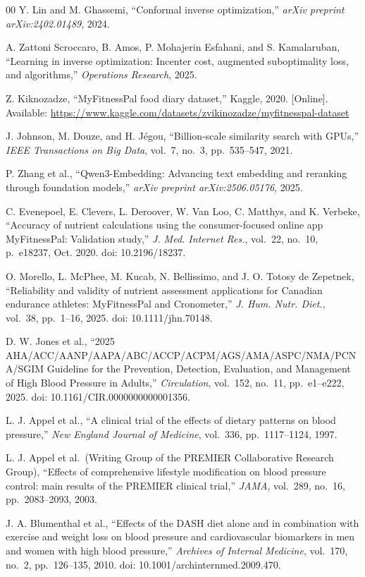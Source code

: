 \documentclass[journal]{IEEEtran}
\begin{document}
\begin{thebibliography}{00}
Y. Lin and M. Ghassemi,
``Conformal inverse optimization,''
\textit{arXiv preprint arXiv:2402.01489}, 2024.

A. Zattoni Scroccaro, B. Amos, P. Mohajerin Esfahani, and
S. Kamalaruban,
``Learning in inverse optimization: Incenter cost,
augmented suboptimality loss, and algorithms,''
\textit{Operations Research}, 2025.

Z. Kiknozadze,
``MyFitnessPal food diary dataset,'' Kaggle, 2020.
[Online]. Available:
\url{https://www.kaggle.com/datasets/zvikinozadze/myfitnesspal-dataset}

J. Johnson, M. Douze, and H. J\'{e}gou,
``Billion-scale similarity search with GPUs,''
\textit{IEEE Transactions on Big Data}, vol.~7, no.~3,
pp.~535--547, 2021.

P. Zhang et al.,
``Qwen3-Embedding: Advancing text embedding and reranking through
foundation models,''
\textit{arXiv preprint arXiv:2506.05176}, 2025.

C. Evenepoel, E. Clevers, L. Deroover, W. Van Loo, C. Matthys, and K. Verbeke,
``Accuracy of nutrient calculations using the consumer-focused online
app MyFitnessPal: Validation study,''
\textit{J. Med. Internet Res.}, vol.~22, no.~10, p.~e18237, Oct. 2020.
doi: 10.2196/18237.

O. Morello, L. McPhee, M. Kucab, N. Bellissimo, and J. O. Totosy de Zepetnek,
``Reliability and validity of nutrient assessment applications for
Canadian endurance athletes: MyFitnessPal and Cronometer,''
\textit{J. Hum. Nutr. Diet.}, vol.~38, pp.~1--16, 2025.
doi: 10.1111/jhn.70148.

D. W. Jones et al.,
``2025 AHA/ACC/AANP/AAPA/ABC/ACCP/ACPM/AGS/AMA/ASPC/NMA/PCNA/SGIM
Guideline for the Prevention, Detection, Evaluation, and Management of
High Blood Pressure in Adults,''
\textit{Circulation}, vol.~152, no.~11, pp.~e1--e222, 2025.
doi: 10.1161/CIR.0000000000001356.

L. J. Appel et al.,
``A clinical trial of the effects of dietary patterns on blood pressure,''
\textit{New England Journal of Medicine}, vol.~336, pp.~1117--1124, 1997.

L. J. Appel et al.\ (Writing Group of the PREMIER Collaborative Research Group),
``Effects of comprehensive lifestyle modification on blood pressure control:
main results of the PREMIER clinical trial,''
\textit{JAMA}, vol.~289, no.~16, pp.~2083--2093, 2003.

J. A. Blumenthal et al.,
``Effects of the DASH diet alone and in combination with exercise and weight
loss on blood pressure and cardiovascular biomarkers in men and women with
high blood pressure,''
\textit{Archives of Internal Medicine}, vol.~170, no.~2, pp.~126--135, 2010.
doi: 10.1001/archinternmed.2009.470.

\end{thebibliography}
\end{document}
